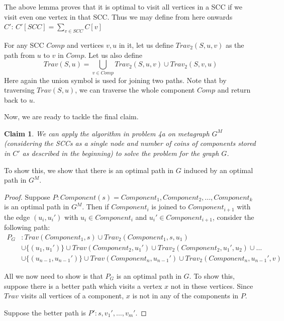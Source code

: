 \documentclass[answers]{exam}
\newtheorem*{claim}{Claim}
\begin{document}
\begin{questions}
\begin{parts}
\begin{solution}
The above lemma proves that it is optimal to visit all vertices in a SCC if we visit even one vertex in that SCC. Thus we may define from here onwards $C':\,C'[SCC]=\sum_{v \in SCC} C[v]$

For any SCC $Comp$ and vertices $v, u$ in it, let us define $Trav_2(S, u, v)$ as the path from $u$ to $v$ in $Comp$. Let us also define
\[
Trav(S, u) = \bigcup_{v \in Comp} Trav_2(S, u, v) \cup Trav_2(S, v, u)
\]
Here again the union symbol is used for joining two paths. Note that by traversing $Trav(S, u)$, we can traverse the whole component $Comp$ and return back to $u$.

Now, we are ready to tackle the final claim.\\

\begin{claim}
We can apply the algorithm in problem 4a on metagraph $G^M$ (considering the SCCs as a single node and number of coins of components stored in $C'$ as described in the beginning) to solve the problem for the graph $G$.
\end{claim}


To show this, we show that there is an optimal path in $G$ induced by an optimal path in $G^M$.

\begin{proof}
Suppose $P: Component(s) = Component_1, Component_2, ..., Component_k$ is an optimal path in $G^M$. Then if $Component_i$ is joined to $Component_{i + 1}$ with the edge $(u_i, u_i')$ with $u_i \in Component_i$ and $u_i' \in Component_{i + 1}$, consider the following path:
\begin{align*}
P_G&: Trav(Component_1, s) \cup Trav_2(Component_1, s, u_1)\\
    & \cup \{(u_1, u_1')\} \cup Trav(Component_2, u_1') \cup Trav_2(Component_2, u_1', u_2) \cup \dots \\
    & \cup \{(u_{n - 1}, u_{n - 1}')\} \cup Trav(Component_n, u_{n - 1}') \cup Trav_2(Component_n, u_{n - 1}', v)
\end{align*}

All we now need to show is that $P_G$ is an optimal path in $G$. To show this, suppose there is a better path which visits a vertex $x$ not in these vertices. Since $Trav$ visits all vertices of a component, $x$ is not in any of the components in $P$.

Suppose the better path is $P': s, v_1', \dots, v_m'$.


\end{proof}
\end{solution}
\end{parts}
\end{questions}
\end{document}
